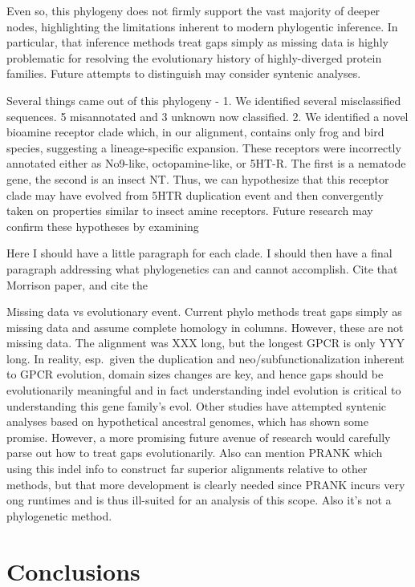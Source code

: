 \documentclass[fleqn,10pt]{wlpeerj}
\begin{document}
Even so, this phylogeny does not firmly support the vast majority of deeper nodes, highlighting the limitations inherent to modern phylogentic inference. In particular, that inference methods treat gaps simply as missing data is highly problematic for resolving the evolutionary history of highly-diverged protein families. Future attempts to distinguish may consider syntenic analyses.





Several things came out of this phylogeny - 
1. We identified several misclassified sequences. 5 misannotated and 3 unknown now classified. 
2. We identified a novel bioamine receptor clade which, in our alignment, contains only frog and bird species, suggesting a lineage-specific expansion. These receptors were incorrectly annotated either as No9-like, octopamine-like, or 5HT-R. The first is a nematode gene, the second is an insect NT. Thus, we can hypothesize that this receptor clade may have evolved from 5HTR duplication event and then convergently taken on properties similar to insect amine receptors. Future research may confirm these hypotheses by examining
 

 

Here I should have a little paragraph for each clade. I should then have a final paragraph addressing what phylogenetics can and cannot accomplish. Cite that Morrison paper, and cite the

Missing data vs evolutionary event. Current phylo methods treat gaps simply as missing data and assume complete homology in columns. However, these are not missing data. The alignment was XXX long, but the longest GPCR is only YYY long. In reality, esp.\ given the duplication and neo/subfunctionalization inherent to GPCR evolution, domain sizes changes are key, and hence gaps should be evolutionarily meaningful and in fact understanding indel evolution is critical to understanding this gene family's evol. Other studies have attempted syntenic analyses based on hypothetical ancestral genomes, which has shown some promise. However, a more promising future avenue of research would carefully parse out how to treat gaps evolutionarily. Also can mention PRANK which using this indel info to construct far superior alignments relative to other methods, but that more development is clearly needed since PRANK incurs very ong runtimes and is thus ill-suited for an analysis of this scope. Also it's not a phylogenetic method.

\section*{Conclusions}
\end{document}
